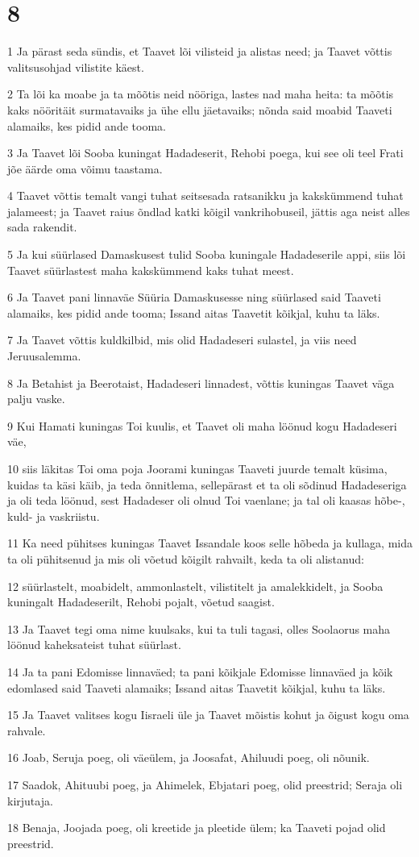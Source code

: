 \chapter{8}

\par 1 Ja pärast seda sündis, et Taavet lõi vilisteid ja alistas need; ja Taavet võttis valitsusohjad vilistite käest.
\par 2 Ta lõi ka moabe ja ta mõõtis neid nööriga, lastes nad maha heita: ta mõõtis kaks nööritäit surmatavaiks ja ühe ellu jäetavaiks; nõnda said moabid Taaveti alamaiks, kes pidid ande tooma.
\par 3 Ja Taavet lõi Sooba kuningat Hadadeserit, Rehobi poega, kui see oli teel Frati jõe äärde oma võimu taastama.
\par 4 Taavet võttis temalt vangi tuhat seitsesada ratsanikku ja kakskümmend tuhat jalameest; ja Taavet raius õndlad katki kõigil vankrihobuseil, jättis aga neist alles sada rakendit.
\par 5 Ja kui süürlased Damaskusest tulid Sooba kuningale Hadadeserile appi, siis lõi Taavet süürlastest maha kakskümmend kaks tuhat meest.
\par 6 Ja Taavet pani linnaväe Süüria Damaskusesse ning süürlased said Taaveti alamaiks, kes pidid ande tooma; Issand aitas Taavetit kõikjal, kuhu ta läks.
\par 7 Ja Taavet võttis kuldkilbid, mis olid Hadadeseri sulastel, ja viis need Jeruusalemma.
\par 8 Ja Betahist ja Beerotaist, Hadadeseri linnadest, võttis kuningas Taavet väga palju vaske.
\par 9 Kui Hamati kuningas Toi kuulis, et Taavet oli maha löönud kogu Hadadeseri väe,
\par 10 siis läkitas Toi oma poja Joorami kuningas Taaveti juurde temalt küsima, kuidas ta käsi käib, ja teda õnnitlema, sellepärast et ta oli sõdinud Hadadeseriga ja oli teda löönud, sest Hadadeser oli olnud Toi vaenlane; ja tal oli kaasas hõbe-, kuld- ja vaskriistu.
\par 11 Ka need pühitses kuningas Taavet Issandale koos selle hõbeda ja kullaga, mida ta oli pühitsenud ja mis oli võetud kõigilt rahvailt, keda ta oli alistanud:
\par 12 süürlastelt, moabidelt, ammonlastelt, vilistitelt ja amalekkidelt, ja Sooba kuningalt Hadadeserilt, Rehobi pojalt, võetud saagist.
\par 13 Ja Taavet tegi oma nime kuulsaks, kui ta tuli tagasi, olles Soolaorus maha löönud kaheksateist tuhat süürlast.
\par 14 Ja ta pani Edomisse linnaväed; ta pani kõikjale Edomisse linnaväed ja kõik edomlased said Taaveti alamaiks; Issand aitas Taavetit kõikjal, kuhu ta läks.
\par 15 Ja Taavet valitses kogu Iisraeli üle ja Taavet mõistis kohut ja õigust kogu oma rahvale.
\par 16 Joab, Seruja poeg, oli väeülem, ja Joosafat, Ahiluudi poeg, oli nõunik.
\par 17 Saadok, Ahituubi poeg, ja Ahimelek, Ebjatari poeg, olid preestrid; Seraja oli kirjutaja.
\par 18 Benaja, Joojada poeg, oli kreetide ja pleetide ülem; ka Taaveti pojad olid preestrid.

